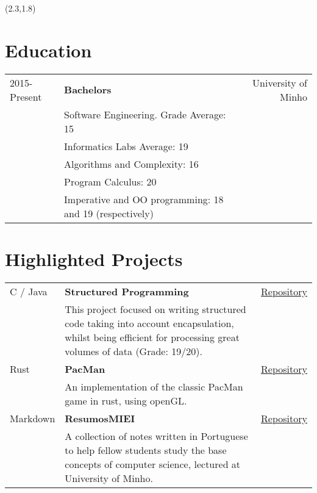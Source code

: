 \documentclass{article}
\begin{document}
\begin{textblock}{7.3}(2.3,1.8)

    \section{Education}
    \begin{tabular}{lp{8.4cm}r}
        2015-Present & \textbf{Bachelors} & University of Minho\\
        & Software Engineering. Grade Average: 15 &\\
        & Informatics Labs Average: 19 & \\
        & Algorithms and Complexity: 16 & \\
        & Program Calculus: 20 & \\
        & Imperative and OO programming: 18 and 19 (respectively) &\\
    \end{tabular}
    \section{Highlighted Projects}
    \begin{tabular}{lp{10.4cm}r}
        C / Java & \textbf{Structured Programming} & \href{https://github.com/Mendess2526/LI3_StructuredPrograming}{Repository}\\
        & This project focused on writing structured code taking into account
        encapsulation, whilst being efficient for processing great volumes of
        data (Grade: 19/20). &\\
        Rust & \textbf{PacMan} & \href{https://github.com/Mendess2526/rust-pacman}{Repository}\\
        & An implementation of the classic PacMan game in rust, using openGL. &\\
        Markdown & \textbf{ResumosMIEI} & \href{https://github.com/Mendess2526/ResumosMIEI}{Repository}\\
        & A collection of notes written in Portuguese to help fellow students
        study the base concepts of computer science, lectured at University of
        Minho. &\\
    \end{tabular}


\end{textblock}
\end{document}
